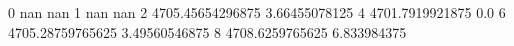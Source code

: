 0 nan nan
1 nan nan
2 4705.45654296875 3.66455078125
4 4701.7919921875 0.0
6 4705.28759765625 3.49560546875
8 4708.6259765625 6.833984375
